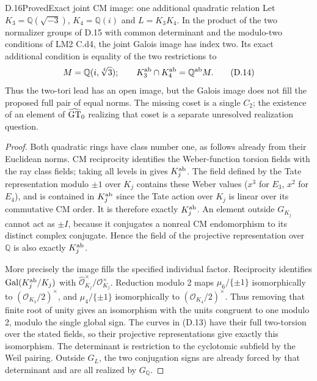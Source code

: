 \begin{statement}{D.16}{Proved}{Exact joint CM image: one additional quadratic relation}
Let $K_3=\mathbb Q(\sqrt{-3})$, $K_4=\mathbb Q(i)$ and $L=K_3K_4$. In the product of the two normalizer groups of D.15 with common determinant and the modulo-two conditions of LM2 C.d4, the joint Galois image has index two. Its exact additional condition is equality of the two restrictions to
\[
 M=\mathbb Q(i,\sqrt[4]{3});\qquad
 K_3^{\rm ab}\cap K_4^{\rm ab}=\mathbb Q^{\rm ab}M.         \tag{D.14}
\]
Thus the two-tori lead has an open image, but the Galois image does not fill the proposed full pair of equal norms. The missing coset is a single $C_2$; the existence of an element of $\widehat{\rm GT}_0$ realizing that coset is a separate unresolved realization question.
\end{statement}
\begin{proof}
Both quadratic rings have class number one, as follows already from their Euclidean norms. CM reciprocity identifies the Weber-function torsion fields with the ray class fields; taking all levels in \cite[Corollary 3.4]{dLozano2022} gives $K_j^{\rm ab}$. The field defined by the Tate representation modulo $\pm1$ over $K_j$ contains these Weber values ($x^3$ for $E_3$, $x^2$ for $E_4$), and is contained in $K_j^{\rm ab}$ since the Tate action over $K_j$ is linear over its commutative CM order. It is therefore exactly $K_j^{\rm ab}$. An element outside $G_{K_j}$ cannot act as $\pm I$, because it conjugates a nonreal CM endomorphism to its distinct complex conjugate. Hence the field of the projective representation over $\mathbb Q$ is also exactly $K_j^{\rm ab}$.

More precisely the image fills the specified individual factor. Reciprocity identifies $\operatorname{Gal}(K_j^{\rm ab}/K_j)$ with $\widehat{\mathcal O}_{K_j}^{\times}/\mathcal O_{K_j}^{\times}$. Reduction modulo 2 maps $\mu_6/\{\pm1\}$ isomorphically to $(\mathcal O_{K_3}/2)^\times$, and $\mu_4/\{\pm1\}$ isomorphically to $(\mathcal O_{K_4}/2)^\times$. Thus removing that finite root of unity gives an isomorphism with the units congruent to one modulo 2, modulo the single global sign. The curves in (D.13) have their full two-torsion over the stated fields, so their projective representations give exactly this isomorphism. The determinant is restriction to the cyclotomic subfield by the Weil pairing. Outside $G_L$, the two conjugation signs are already forced by that determinant and are all realized by $G_{\mathbb Q}$.


\end{proof}
